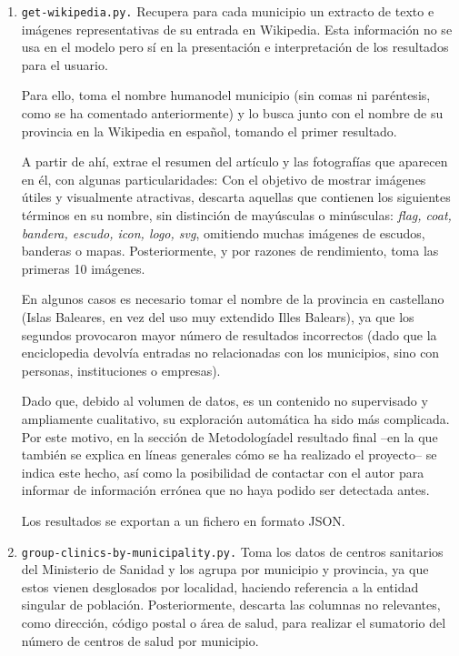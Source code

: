 \begin{enumerate}
    \item \texttt{get-wikipedia.py.} Recupera para cada municipio un extracto de texto e imágenes representativas de su entrada en Wikipedia. Esta información no se usa en el modelo pero sí en la presentación e interpretación de los resultados para el usuario.

    Para ello, toma el nombre \guillemotleft humano\guillemotright\space del municipio (sin comas ni paréntesis, como se ha comentado anteriormente) y lo busca junto con el nombre de su provincia en la Wikipedia en español, tomando el primer resultado.
    
    A partir de ahí, extrae el resumen del artículo y las fotografías que aparecen en él, con algunas particularidades: Con el objetivo de mostrar imágenes útiles y visualmente atractivas, descarta aquellas que contienen los siguientes términos en su nombre, sin distinción de mayúsculas o minúsculas: \textit{flag, coat, bandera, escudo, icon, logo, svg}, omitiendo muchas imágenes de escudos, banderas o mapas. Posteriormente, y por razones de rendimiento, toma las primeras 10 imágenes.
    
    En algunos casos es necesario tomar el nombre de la provincia en castellano (\guillemotleft Islas Baleares\guillemotright, en vez del uso muy extendido \guillemotleft Illes Balears\guillemotright\space), ya que los segundos provocaron mayor número de resultados incorrectos (dado que la enciclopedia devolvía entradas no relacionadas con los municipios, sino con personas, instituciones o empresas).
    
    Dado que, debido al volumen de datos, es un contenido no supervisado y ampliamente cualitativo, su exploración automática ha sido más complicada. Por este motivo, en la sección de \guillemotleft Metodología\guillemotright\space del resultado final –en la que también se explica en líneas generales cómo se ha realizado el proyecto– se indica este hecho, así como la posibilidad de contactar con el autor para informar de información errónea que no haya podido ser detectada antes.
    
    Los resultados se exportan a un fichero en formato JSON.

    \item \texttt{group-clinics-by-municipality.py.} Toma los datos de centros sanitarios del Ministerio de Sanidad y los agrupa por municipio y provincia, ya que estos vienen desglosados por localidad, haciendo referencia a la entidad singular de población. Posteriormente, descarta las columnas no relevantes, como dirección, código postal o área de salud, para realizar el sumatorio del número de centros de salud por municipio.


\end{enumerate}
